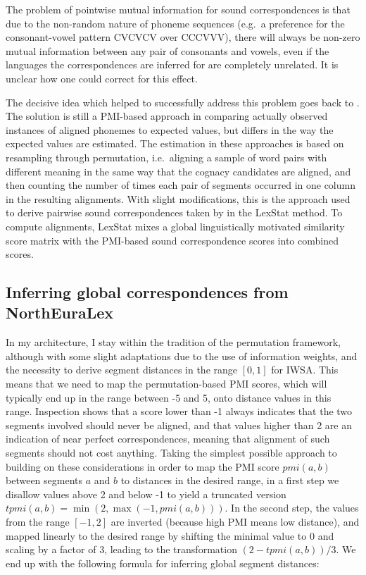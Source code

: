 The problem of pointwise mutual information for sound correspondences is that due to the non-random nature of phoneme sequences (e.g.\ a preference for the consonant-vowel pattern CVCVCV over CCCVVV), there will always be non-zero mutual information between any pair of consonants and vowels, even if the languages the correspondences are inferred for are completely unrelated. It is unclear how one could correct for this effect.

The decisive idea which helped to successfully address this problem goes back to \cite{kessler2001}. The solution is still a PMI-based approach in comparing actually observed instances of aligned phonemes to expected values, but differs in the way the expected values are estimated. The estimation in these approaches is based on resampling through permutation, i.e.\ aligning a sample of word pairs with different meaning in the same way that the cognacy candidates are aligned, and then counting the number of times each pair of segments occurred in one column in the resulting alignments. With slight modifications, this is the approach used to derive pairwise sound correspondences taken by \cite{list2012} in the LexStat method. To compute alignments, LexStat mixes a global linguistically motivated similarity score matrix with the PMI-based sound correspondence scores into combined scores.

\subsection{Inferring global correspondences from NorthEuraLex}
In my architecture, I stay within the tradition of the permutation framework, although with some slight adaptations due to the use of information weights, and the necessity to derive segment distances in the range $[0,1]$ for IWSA. This means that we need to map the permutation-based PMI scores, which will typically end up in the range between -5 and 5, onto distance values in this range. Inspection shows that a score lower than -1 always indicates that the two segments involved should never be aligned, and that values higher than 2 are an indication of near perfect correspondences, meaning that alignment of such segments should not cost anything. Taking the simplest possible approach to building on these considerations in order to map the PMI score $pmi(a,b)$ between segments $a$ and $b$ to distances in the desired range, in a first step we disallow values above 2 and below -1 to yield a truncated version $tpmi(a,b) = \min(2,\max(-1,pmi(a,b)))$. In the second step, the values from the range $[-1,2]$ are 
inverted (because high PMI means low distance), and mapped linearly to the desired range by shifting the minimal value to $0$ and scaling by a factor of $3$, leading to the transformation $(2 - tpmi(a,b))/3$. We end up with the following formula for inferring global segment distances:

